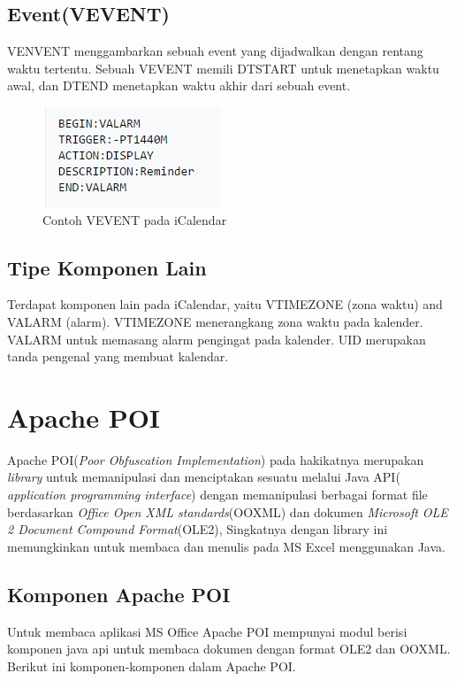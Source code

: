 \subsection{Event(VEVENT)}
VENVENT menggambarkan sebuah event yang dijadwalkan dengan rentang waktu tertentu. Sebuah VEVENT memili DTSTART untuk menetapkan waktu awal, dan DTEND menetapkan waktu akhir dari sebuah event.\cite{iCalendar}
\begin{figure}[H]
	\centering
	\includegraphics[scale=0.5]{Gambar/CaptureiCalendarEvent}
	\caption{Contoh VEVENT pada iCalendar}
\end{figure}

\subsection{Tipe Komponen Lain}
Terdapat komponen lain pada iCalendar, yaitu VTIMEZONE (zona waktu) and VALARM (alarm). VTIMEZONE  menerangkang zona waktu pada kalender. VALARM untuk memasang alarm pengingat pada kalender. UID merupakan tanda pengenal yang membuat kalendar. \cite{iCalendar}



\section{Apache POI}
\label{sec:apache} 

Apache POI(\textit{Poor Obfuscation Implementation}) pada hakikatnya merupakan \textit{library} untuk memanipulasi dan menciptakan sesuatu melalui Java API( \textit{application programming interface}) dengan memanipulasi berbagai format file berdasarkan \textit{Office Open XML standards}(OOXML) dan dokumen \textit{Microsoft OLE 2 Document Compound Format}(OLE2), Singkatnya dengan library ini memungkinkan untuk membaca dan menulis pada MS Excel menggunakan Java.\cite{apachepoi} \\


\subsection{Komponen Apache POI}
\label{subs:komponen} 
Untuk membaca aplikasi MS Office Apache POI mempunyai modul berisi komponen java api untuk membaca dokumen dengan format OLE2 dan OOXML. Berikut ini komponen-komponen dalam Apache POI.\cite{apachepoi}  

